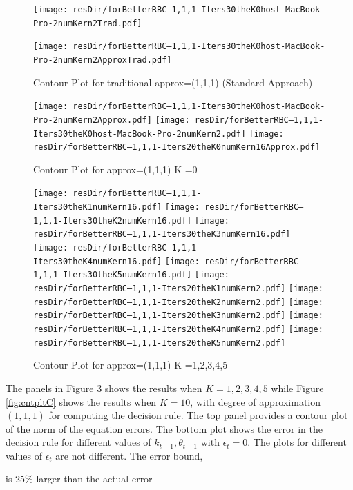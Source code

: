 \documentclass[12pt]{article}
\begin{document}
\begin{figure}
  \centering
\ifmacosx

  \texttt{[image: resDir/forBetterRBC--1,1,1-Iters30theK0host-MacBook-Pro-2numKern2Trad.pdf]}


  \texttt{[image: resDir/forBetterRBC--1,1,1-Iters30theK0host-MacBook-Pro-2numKern2ApproxTrad.pdf]}
\fi
\iflinux
\fi
  \caption{Contour Plot for traditional approx=(1,1,1) (Standard Approach)}
  \label{fig:tradOne}
\end{figure}


\begin{figure}
  \centering
\ifmacosx
  \texttt{[image: resDir/forBetterRBC--1,1,1-Iters30theK0host-MacBook-Pro-2numKern2Approx.pdf]}
  \texttt{[image: resDir/forBetterRBC--1,1,1-Iters30theK0host-MacBook-Pro-2numKern2.pdf]}
\fi
\iflinux
\texttt{[image: resDir/forBetterRBC--1,1,1-Iters20theK0numKern16Approx.pdf]}
\fi
  \caption{Contour Plot for approx=(1,1,1) K =0 }
  \label{fig:cntpltA}
\end{figure}




\begin{figure}
  \centering
\iflinux
\texttt{[image: resDir/forBetterRBC--1,1,1-Iters30theK1numKern16.pdf]}
\texttt{[image: resDir/forBetterRBC--1,1,1-Iters30theK2numKern16.pdf]}
\texttt{[image: resDir/forBetterRBC--1,1,1-Iters30theK3numKern16.pdf]}
\texttt{[image: resDir/forBetterRBC--1,1,1-Iters30theK4numKern16.pdf]}
\texttt{[image: resDir/forBetterRBC--1,1,1-Iters30theK5numKern16.pdf]}
\fi
\ifmacosx
\texttt{[image: resDir/forBetterRBC--1,1,1-Iters20theK1numKern2.pdf]}
\texttt{[image: resDir/forBetterRBC--1,1,1-Iters20theK2numKern2.pdf]}
\texttt{[image: resDir/forBetterRBC--1,1,1-Iters20theK3numKern2.pdf]}
\texttt{[image: resDir/forBetterRBC--1,1,1-Iters20theK4numKern2.pdf]}
\texttt{[image: resDir/forBetterRBC--1,1,1-Iters20theK5numKern2.pdf]}
\fi
  \caption{Contour Plot for approx=(1,1,1)  K =1,2,3,4,5}
  \label{fig:cntpltB}
\end{figure}



The panels in Figure \ref{fig:cntpltB} shows the results when $K=1,2,3,4,5$
while 
Figure \ref{fig:cntpltC} shows the results when $K=10$, with degree of approximation $(1,1,1)$
for computing the decision rule.  The top panel provides a contour plot of the
norm of the equation errors. The bottom plot shows the error in the decision rule for different values of $k_{t-1}, \theta_{t-1}$ with $\epsilon_t=0$.  The plots for different values of $\epsilon_t$ are not different.  The error bound, 
\ifmacosx
 
\fi
is 25\% larger than the actual error 
\iflinux
 
\fi
\end{document}
